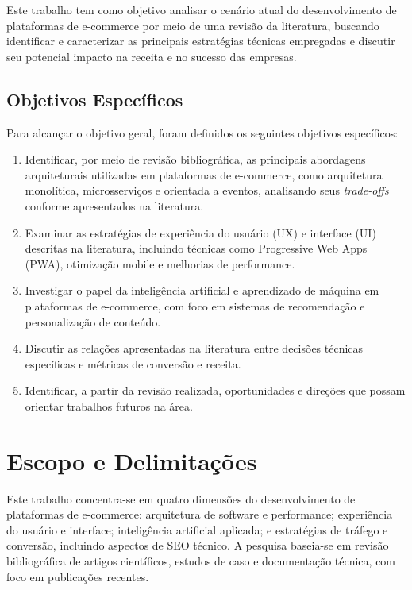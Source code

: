 Este trabalho tem como objetivo analisar o cenário atual do desenvolvimento de plataformas de e-commerce por meio de uma revisão da literatura, buscando identificar e caracterizar as principais estratégias técnicas empregadas e discutir seu potencial impacto na receita e no sucesso das empresas.

\subsection{Objetivos Específicos}

Para alcançar o objetivo geral, foram definidos os seguintes objetivos específicos:

\begin{enumerate}
    \item Identificar, por meio de revisão bibliográfica, as principais abordagens arquiteturais utilizadas em plataformas de e-commerce, como arquitetura monolítica, microsserviços e orientada a eventos, analisando seus \textit{trade-offs} conforme apresentados na literatura.

    \item Examinar as estratégias de experiência do usuário (UX) e interface (UI) descritas na literatura, incluindo técnicas como Progressive Web Apps (PWA), otimização mobile e melhorias de performance.

    \item Investigar o papel da inteligência artificial e aprendizado de máquina em plataformas de e-commerce, com foco em sistemas de recomendação e personalização de conteúdo.

    \item Discutir as relações apresentadas na literatura entre decisões técnicas específicas e métricas de conversão e receita.

    \item Identificar, a partir da revisão realizada, oportunidades e direções que possam orientar trabalhos futuros na área.
\end{enumerate}

\section{Escopo e Delimitações}

Este trabalho concentra-se em quatro dimensões do desenvolvimento de plataformas de e-commerce: arquitetura de software e performance; experiência do usuário e interface; inteligência artificial aplicada; e estratégias de tráfego e conversão, incluindo aspectos de SEO técnico. A pesquisa baseia-se em revisão bibliográfica de artigos científicos, estudos de caso e documentação técnica, com foco em publicações recentes.

